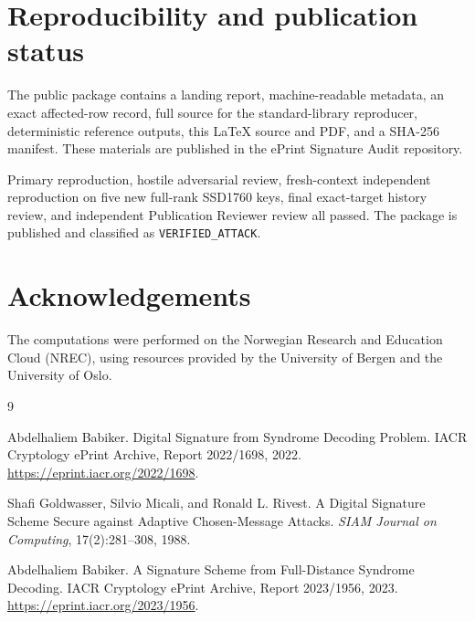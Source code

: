 \documentclass[10pt,a4paper]{article}
\begin{document}
\section{Reproducibility and publication status}

The public package contains a landing report, machine-readable
metadata, an exact affected-row record, full source for the standard-library
reproducer, deterministic reference outputs, this \LaTeX{} source and PDF,
and a SHA-256 manifest. These materials are published in the ePrint Signature
Audit repository.

Primary reproduction, hostile adversarial review, fresh-context independent
reproduction on five new full-rank SSD1760 keys, final exact-target history
review, and independent Publication Reviewer review all passed. The package is
published and classified as \texttt{VERIFIED\_ATTACK}.

\section*{Acknowledgements}
The computations were performed on the Norwegian Research and Education Cloud (NREC), using resources provided by the University of Bergen and the University of Oslo.

\begin{thebibliography}{9}

Abdelhaliem Babiker.
\newblock Digital Signature from Syndrome Decoding Problem.
\newblock IACR Cryptology ePrint Archive, Report 2022/1698, 2022.
\newblock \url{https://eprint.iacr.org/2022/1698}.

Shafi Goldwasser, Silvio Micali, and Ronald L. Rivest.
\newblock A Digital Signature Scheme Secure against Adaptive Chosen-Message
Attacks.
\newblock \emph{SIAM Journal on Computing}, 17(2):281--308, 1988.

Abdelhaliem Babiker.
\newblock A Signature Scheme from Full-Distance Syndrome Decoding.
\newblock IACR Cryptology ePrint Archive, Report 2023/1956, 2023.
\newblock \url{https://eprint.iacr.org/2023/1956}.

\end{thebibliography}
\end{document}
